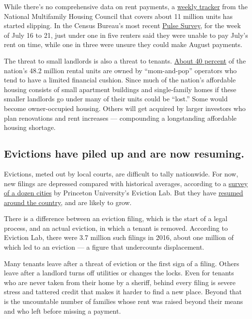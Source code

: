 While there's no comprehensive data on rent payments, a
\href{https://www.nmhc.org/research-insight/nmhc-rent-payment-tracker/}{weekly
tracker} from the National Multifamily Housing Council that covers about
11 million units has started slipping. In the Census Bureau's most
recent
\href{https://www.census.gov/data/tables/2020/demo/hhp/hhp12.html}{Pulse
Survey}, for the week of July 16 to 21, just under one in five renters
said they were unable to pay July's rent on time, while one in three
were unsure they could make August payments.

The threat to small landlords is also a threat to tenants.
\href{https://www.hud.gov/press/press_releases_media_advisories/HUD_No_20_071}{About
40 percent} of the nation's 48.2 million rental units are owned by
``mom-and-pop'' operators who tend to have a limited financial cushion.
Since much of the nation's affordable housing consists of small
apartment buildings and single-family homes if these smaller landlords
go under many of their units could be ``lost.'' Some would become
owner-occupied housing. Others will get acquired by larger investors who
plan renovations and rent increases --- compounding a longstanding
affordable housing shortage.

\hypertarget{evictions-have-piled-up-and-are-now-resuming}{%
\subsection{Evictions have piled up and are now
resuming.}\label{evictions-have-piled-up-and-are-now-resuming}}

Evictions, meted out by local courts, are difficult to tally nationwide.
For now, new filings are depressed compared with historical averages,
according to a \href{https://evictionlab.org/eviction-tracking/}{survey
of a dozen cities} by Princeton University's Eviction Lab. But they have
\href{https://www.nytimes3xbfgragh.onion/2020/07/23/business/evictions-moratorium-cares-act.html}{resumed
around the country}, and are likely to grow.

There is a difference between an eviction filing, which is the start of
a legal process, and an actual eviction, in which a tenant is removed.
According to Eviction Lab, there were 3.7 million such filings in 2016,
about one million of which led to an eviction --- a figure that
undercounts displacement.

Many tenants leave after a threat of eviction or the first sign of a
filing. Others leave after a landlord turns off utilities or changes the
locks. Even for tenants who are never taken from their home by a
sheriff, behind every filing is severe stress and tattered credit that
makes it harder to find a new place. Beyond that is the uncountable
number of families whose rent was raised beyond their means and who left
before missing a payment.

